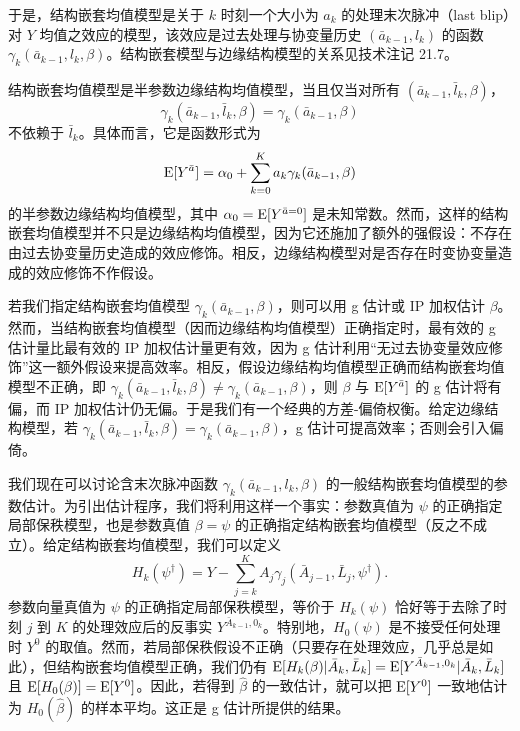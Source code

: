 于是，结构嵌套均值模型是关于 $k$ 时刻一个大小为 $a_k$ 的处理末次脉冲（last blip）对 $Y$ 均值之效应的模型，该效应是过去处理与协变量历史 $(\bar a_{k-1},l_k)$ 的函数 $\gamma_k(\bar a_{k-1},l_k,\beta)$。结构嵌套模型与边缘结构模型的关系见技术注记 21.7。

\begin{techpoint}[边缘结构模型与结构嵌套模型]
结构嵌套均值模型是半参数边缘结构均值模型，当且仅当对所有 $(\bar a_{k-1},\bar l_k,\beta)$，
\[
\gamma_k(\bar a_{k-1},\bar l_k,\beta)=\gamma_k(\bar a_{k-1},\beta)
\]
不依赖于 $\bar l_k$。具体而言，它是函数形式为
\[
\mathrm{E}[Y^{\bar a}]=\alpha_0+\sum_{k=0}^{K}a_k\gamma_k(\bar a_{k-1},\beta)
\]
的半参数边缘结构均值模型，其中 $\alpha_0=\mathrm{E}[Y^{\bar a=0}]$ 是未知常数。然而，这样的结构嵌套均值模型并不只是边缘结构均值模型，因为它还施加了额外的强假设：不存在由过去协变量历史造成的效应修饰。相反，边缘结构模型对是否存在时变协变量造成的效应修饰不作假设。

若我们指定结构嵌套均值模型 $\gamma_k(\bar a_{k-1},\beta)$，则可以用 g 估计或 IP 加权估计 $\beta$。然而，当结构嵌套均值模型（因而边缘结构均值模型）正确指定时，最有效的 g 估计量比最有效的 IP 加权估计量更有效，因为 g 估计利用“无过去协变量效应修饰”这一额外假设来提高效率。相反，假设边缘结构均值模型正确而结构嵌套均值模型不正确，即 $\gamma_k(\bar a_{k-1},\bar l_k,\beta)\neq\gamma_k(\bar a_{k-1},\beta)$，则 $\beta$ 与 $\mathrm{E}[Y^{\bar a}]$ 的 g 估计将有偏，而 IP 加权估计仍无偏。于是我们有一个经典的方差-偏倚权衡。给定边缘结构模型，若 $\gamma_k(\bar a_{k-1},\bar l_k,\beta)=\gamma_k(\bar a_{k-1},\beta)$，g 估计可提高效率；否则会引入偏倚。
\end{techpoint}

我们现在可以讨论含末次脉冲函数 $\gamma_k(\bar a_{k-1},l_k,\beta)$ 的一般结构嵌套均值模型的参数估计。为引出估计程序，我们将利用这样一个事实：参数真值为 $\psi$ 的正确指定局部保秩模型，也是参数真值 $\beta=\psi$ 的正确指定结构嵌套均值模型（反之不成立）。给定结构嵌套均值模型，我们可以定义
\[
H_k(\psi^\dagger)=Y-\sum_{j=k}^{K}A_j\gamma_j(\bar A_{j-1},\bar L_j,\psi^\dagger).
\]
参数向量真值为 $\psi$ 的正确指定局部保秩模型，等价于 $H_k(\psi)$ 恰好等于去除了时刻 $j$ 到 $K$ 的处理效应后的反事实 $Y^{\bar A_{k-1},0_k}$。特别地，$H_0(\psi)$ 是不接受任何处理时 $Y^0$ 的取值。然而，若局部保秩假设不正确（只要存在处理效应，几乎总是如此），但结构嵌套均值模型正确，我们仍有 $\mathrm{E}[H_k(\beta)|\bar A_k,\bar L_k]=\mathrm{E}[Y^{\bar A_{k-1},0_k}|\bar A_k,\bar L_k]$ 且 $\mathrm{E}[H_0(\beta)]=\mathrm{E}[Y^0]$。因此，若得到 $\hat\beta$ 的一致估计，就可以把 $\mathrm{E}[Y^0]$ 一致地估计为 $H_0(\hat\beta)$ 的样本平均。这正是 g 估计所提供的结果。

